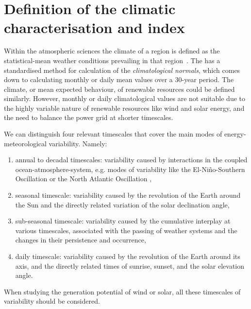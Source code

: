 \documentclass[12pt]{iopart}
\begin{document}

\section{Definition of the climatic characterisation and index}\label{secCP2:clima}

Within the atmospheric sciences the climate of a region is defined as the statistical-mean weather conditions prevailing in that region~\parencite{Arguez2011}. 
The \textcite[WMO;][]{wmo2017normals} has a standardised method for calculation of the \emph{climatological normals}, which comes down to calculating monthly or daily mean values over a 30-year period. 
The climate, or mean expected behaviour, of renewable resources could be defined similarly. 
However, monthly or daily climatological values are not suitable due to the highly variable nature of renewable resources like wind and solar energy, and the need to balance the power grid at shorter timescales.

We can distinguish four relevant timescales that cover the main modes of energy-meteorological variability. 
Namely:
\begin{enumerate}
        \item annual to decadal timescales: variability caused by interactions in the coupled ocean-atmosphere-system, e.g. modes of variability like the El-Ni\~no-Southern Oscillation \parencite[ENSO;][]{ipcc6_wg1_variability} or the North Atlantic Oscillation \parencite[NAO;][]{Wanner2001},
        \item seasonal timescale: variability caused by the revolution of the Earth around the Sun and the directly related variation of the solar declination angle,
        \item sub-seasonal timescale: variability caused by the cumulative interplay at various timescales, associated with the passing of weather systems and the changes in their persistence and occurrence,
        \item daily timescale: variability caused by the revolution of the Earth around its axis, and the directly related times of sunrise, sunset, and the solar elevation angle.
\end{enumerate}
When studying the generation potential of wind or solar, all these timescales of variability should be considered.
\end{document}
